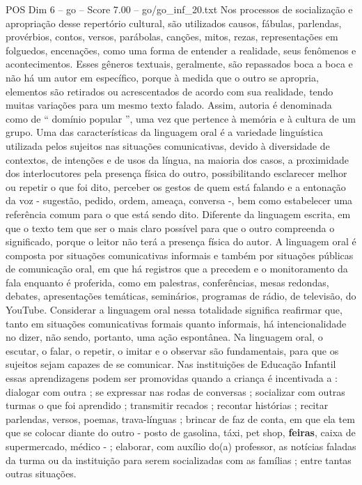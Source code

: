 \begin{textsample}{POS Dim 6 – go – Score 7.00 – go/go\_inf\_20.txt}
Nos processos de socialização e apropriação desse repertório cultural, são utilizados causos, fábulas, parlendas, provérbios, contos, versos, parábolas, canções, mitos, rezas, representações em folguedos, encenações, como uma forma de entender a realidade, seus fenômenos e acontecimentos.
Esses gêneros textuais, geralmente, são repassados boca a boca e não há um autor em específico, porque à medida que o outro se apropria, elementos são retirados ou acrescentados de acordo com sua realidade, tendo muitas variações para um mesmo texto falado.
Assim, autoria é denominada como de “ domínio popular ”, uma vez que pertence à memória e à cultura de um grupo.
Uma das características da linguagem oral é a variedade linguística utilizada pelos sujeitos nas situações comunicativas, devido à diversidade de contextos, de intenções e de usos da língua, na maioria dos casos, a proximidade dos interlocutores pela presença física do outro, possibilitando esclarecer melhor ou repetir o que foi dito, perceber os gestos de quem está falando e a entonação da voz - sugestão, pedido, ordem, ameaça, conversa -, bem como estabelecer uma referência comum para o que está sendo dito.
Diferente da linguagem escrita, em que o texto tem que ser o mais claro possível para que o outro compreenda o significado, porque o leitor não terá a presença física do autor.
A linguagem oral é composta por situações comunicativas informais e também por situações públicas de comunicação oral, em que há registros que a precedem e o monitoramento da fala enquanto é proferida, como em palestras, conferências, mesas redondas, debates, apresentações temáticas, seminários, programas de rádio, de televisão, do YouTube.
Considerar a linguagem oral nessa totalidade significa reafirmar que, tanto em situações comunicativas formais quanto informais, há intencionalidade no dizer, não sendo, portanto, uma ação espontânea.
Na linguagem oral, o escutar, o falar, o repetir, o imitar e o observar são fundamentais, para que os sujeitos sejam capazes de se comunicar.
Nas instituições de Educação Infantil essas aprendizagens podem ser promovidas quando a criança é incentivada a : dialogar com outra ; se expressar nas rodas de conversas ; socializar com outras turmas o que foi aprendido ; transmitir recados ; recontar histórias ; recitar parlendas, versos, poemas, trava-línguas ; brincar de faz de conta, em que ela tem que se colocar diante do outro - posto de gasolina, táxi, pet shop, \textbf{feiras}, caixa de supermercado, médico - ; elaborar, com auxílio do(a) professor, as notícias faladas da turma ou da instituição para serem socializadas com as famílias ; entre tantas outras situações.

\end{textsample}
